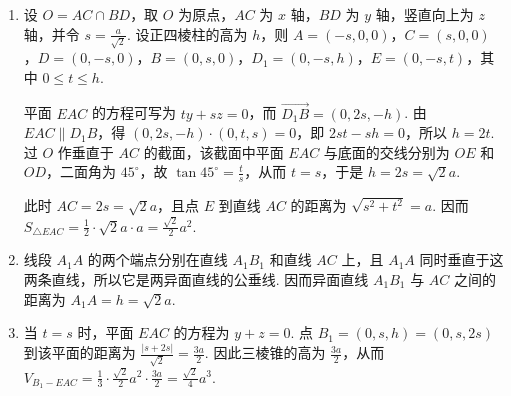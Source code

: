 \documentclass[UTF8,a4paper,oneside,11pt]{ctexbook}
\begin{document}
\begin{solution}
\begin{enumerate}
\item 设 \(O=AC\cap BD\)，取 \(O\) 为原点，\(AC\) 为 \(x\) 轴，\(BD\) 为 \(y\) 轴，竖直向上为 \(z\) 轴，并令 \(s=\frac{a}{\sqrt{2}}\). 设正四棱柱的高为 \(h\)，则 \(A=(-s,0,0)\)，\(C=(s,0,0)\)，\(D=(0,-s,0)\)，\(B=(0,s,0)\)，\(D_1=(0,-s,h)\)，\(E=(0,-s,t)\)，其中 \(0\leqslant t\leqslant h\).

平面 \(EAC\) 的方程可写为 \(ty+sz=0\)，而 \(\overrightarrow{D_1B}=(0,2s,-h)\). 由 \(EAC\parallel D_1B\)，得 \((0,2s,-h)\cdot(0,t,s)=0\)，即 \(2st-sh=0\)，所以 \(h=2t\). 过 \(O\) 作垂直于 \(AC\) 的截面，该截面中平面 \(EAC\) 与底面的交线分别为 \(OE\) 和 \(OD\)，二面角为 \(45^{\circ}\)，故 \(\tan45^{\circ}=\frac{t}{s}\)，从而 \(t=s\)，于是 \(h=2s=\sqrt{2}a\).

此时 \(AC=2s=\sqrt{2}a\)，且点 \(E\) 到直线 \(AC\) 的距离为 \(\sqrt{s^2+t^2}=a\). 因而 \(S_{\triangle EAC}=\frac{1}{2}\cdot\sqrt{2}a\cdot a=\frac{\sqrt{2}}{2}a^2\).
\item 线段 \(A_1A\) 的两个端点分别在直线 \(A_1B_1\) 和直线 \(AC\) 上，且 \(A_1A\) 同时垂直于这两条直线，所以它是两异面直线的公垂线. 因而异面直线 \(A_1B_1\) 与 \(AC\) 之间的距离为 \(A_1A=h=\sqrt{2}a\).
\item 当 \(t=s\) 时，平面 \(EAC\) 的方程为 \(y+z=0\). 点 \(B_1=(0,s,h)=(0,s,2s)\) 到该平面的距离为 \(\frac{|s+2s|}{\sqrt{2}}=\frac{3a}{2}\). 因此三棱锥的高为 \(\frac{3a}{2}\)，从而 \(V_{B_1-EAC}=\frac{1}{3}\cdot\frac{\sqrt{2}}{2}a^2\cdot\frac{3a}{2}=\frac{\sqrt{2}}{4}a^3\).
\end{enumerate}
\end{solution}
\end{document}
